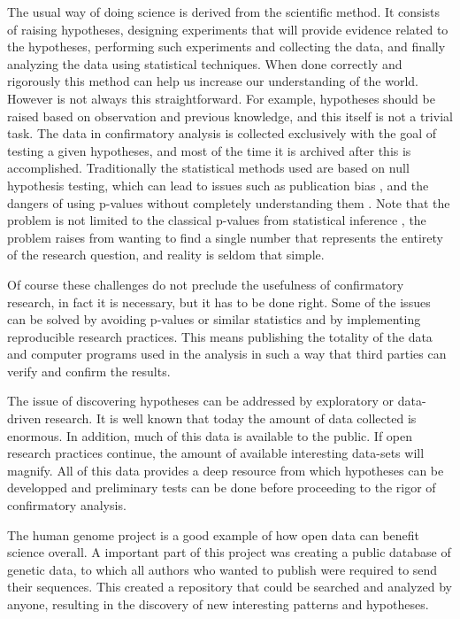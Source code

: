 The usual way of doing science is derived from the scientific method. It consists of raising hypotheses, designing experiments that will provide evidence related to the hypotheses, performing such experiments and collecting the data, and finally analyzing the data using statistical techniques. When done correctly and rigorously this method can help us increase our understanding of the world. However is not always this straightforward. For example, hypotheses should be raised based on observation and previous knowledge, and this itself is not a trivial task. The data in confirmatory analysis is collected exclusively with the goal of testing a given hypotheses, and most of the time it is archived after this is accomplished. Traditionally the statistical methods used are based on null hypothesis testing, which can lead to issues such as publication bias \autocite{ioannidis_why_2005}, and the dangers of using p-values without completely understanding them \autocite{halsey_fickle_2015, nuzzo_scientific_2014, woolston_psychology_2015}. Note that the problem is not limited to the classical p-values from statistical inference \autocite{gelman_so-called_2011}, the problem raises from wanting to find a single number that represents the entirety of the research question, and reality is seldom that simple.

Of course these challenges do not preclude the usefulness of confirmatory research, in fact it is necessary, but it has to be done right. Some of the issues can be solved by avoiding p-values or similar statistics and by implementing reproducible research practices. This means publishing the totality of the data and computer programs used in the analysis in such a way that third parties can verify and confirm the results.

The issue of discovering hypotheses can be addressed by exploratory or data-driven research. It is well known that today the amount of data collected is enormous. In addition, much of this data is available to the public. If open research practices continue, the amount of available interesting data-sets will magnify. All of this data provides a deep resource from which hypotheses can be developped and preliminary tests can be done before proceeding to the rigor of confirmatory analysis.

The human genome project \autocite{green_human_2015} is a good example of how open data can benefit science overall. A important part of this project was creating a public database of genetic data, to which all authors who wanted to publish were required to send their sequences. This created a repository that could be searched and analyzed by anyone, resulting in the discovery of new interesting patterns and hypotheses.

